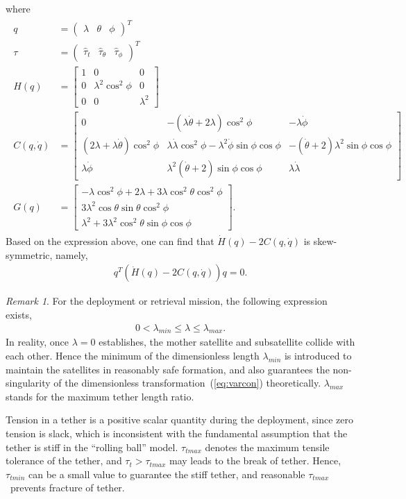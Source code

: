 \documentclass[Journal,letterpaper]{ascelike-new}
\theoremstyle{plain}
\theoremstyle{remark}
\newtheorem{myrem}{Remark}
\begin{document}
where
\begin{align}
\begin{split}
q&= \begin{pmatrix}\lambda&\theta&\phi\end{pmatrix}^T\\
\tau&=\begin{pmatrix}\hat\tau_t&\hat\tau_\theta&\hat\tau_\phi\end{pmatrix}^T\\
H(q) &= \begin{bmatrix}1 &0&0\\0 &\lambda^2\cos^2\phi&0\\0&0&\lambda^2\end{bmatrix}\\
C(q,\dot{q}) &=\begin{bmatrix}0 &-(\lambda\dot \theta+2\lambda)\cos^2\phi&-\lambda\dot\phi\\(2\lambda+\lambda\dot \theta)\cos^2\phi&\lambda\dot \lambda\cos^2\phi-\lambda^2\dot\phi\sin\phi\cos\phi&-(\dot\theta+2)\lambda^2\sin\phi\cos\phi\\ \lambda\dot\phi&\lambda^2(\dot\theta+2)\sin\phi\cos\phi&\lambda\dot \lambda\end{bmatrix}\\
G(q) &=\begin{bmatrix}-\lambda\cos^2\phi+2\lambda+3\lambda\cos ^2\theta\cos^2\phi\\3\lambda^2\cos\theta\sin\theta\cos^2\phi\\\lambda^2+3\lambda^2\cos^2\theta\sin\phi\cos\phi\end{bmatrix}.
\end{split}
\end{align}
Based on the expression above, one can find that $\dot H(q) - 2C(q,\dot{q})$ is skew-symmetric, namely,
\begin{align}
q^T(\dot H(q) - 2C(q,\dot{q}))q = 0.
\end{align}
\begin{myrem}

For the deployment or retrieval mission, the following expression exists,
\begin{align}
0<\lambda_{min}\le\lambda\le \lambda_{max}\label{eq:lambda}.
\end{align}
In reality, once $\lambda = 0$ establishes, the mother satellite and subsatellite collide with each other. Hence the minimum of the dimensionless length $\lambda_{min}$ is introduced to maintain the satellites in reasonably safe formation, and also guarantees the non-singularity of the dimensionless transformation~(\ref{eq:varcon}) theoretically. $\lambda_{max}$ stands for the maximum tether length ratio.\par
Tension in a tether is a positive scalar quantity during the deployment, since zero tension is slack, which is inconsistent with the fundamental assumption that the tether is stiff in the ``rolling ball'' model. $\tau_{tmax}$ denotes the maximum tensile tolerance of the tether, and $\tau_t>\tau_{tmax}$ may leads to the break of tether. Hence, $\tau_{tmin}$ can be a small value to guarantee the stiff tether, and reasonable $\tau_{tmax}$\ prevents fracture of tether.
\end{myrem}
\end{document}
